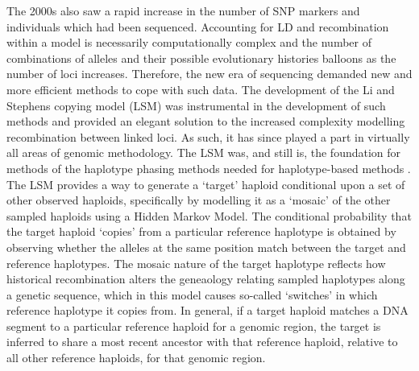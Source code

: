 The 2000s also saw a rapid increase in the number of SNP markers and individuals which had been sequenced. Accounting for LD and recombination within a model is necessarily computationally complex and the number of combinations of alleles and their possible evolutionary histories balloons as the number of loci increases. Therefore, the new era of sequencing demanded new and more efficient methods to cope with such data. The development of the Li and Stephens copying model (LSM) \cite{Li2003} was instrumental in the development of such methods \cite{song2016li} and provided an elegant solution to the increased complexity modelling recombination between linked loci. As such, it has since played a part in virtually all areas of genomic methodology. The LSM was, and still is, the foundation for methods of the haplotype phasing methods needed for haplotype-based methods \cite{stephens2003comparison, stephens2005accounting}. The LSM provides a way to generate a `target' haploid conditional upon a set of other observed haploids, specifically by modelling it as a `mosaic' of  the other sampled haploids using a Hidden Markov Model. The conditional probability that the target haploid `copies' from a particular reference haplotype is obtained by observing whether the alleles at the same position match between the target and reference haplotypes. The mosaic nature of the target haplotype reflects how historical recombination alters the geneaology relating sampled haplotypes along a genetic sequence, which in this model causes so-called `switches' in which reference haplotype it copies from. In general, if a target haploid matches a DNA segment to a particular reference haploid for a genomic region, the target is inferred to share a most recent ancestor with that reference haploid, relative to all other reference haploids, for that genomic region.

